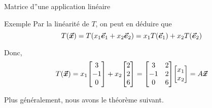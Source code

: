 \documentclass{article}
\begin{document}
\begin{parag}{Matrice d''une application linéaire}
\begin{subparag}{Exemple}
        Par la linéarité de $T$, on peut en déduire que
        \[T\left(\bvec{x}\right) = T\left(x_1 \bvec{e}_1 + x_2 \bvec{e}_2\right)= x_1 T\left(\bvec{e}_1\right) + x_2 T\left(\bvec{e}_2\right)\]

        Donc,
        \[T\left(\bvec{x}\right) = x_1 \begin{bmatrix} 3 \\ -1 \\ 0 \end{bmatrix} + x_2 \begin{bmatrix} 2 \\ 2 \\ 6 \end{bmatrix} = \begin{bmatrix} 3 & 2 \\ -1 & 2 \\ 0 & 6 \end{bmatrix} \begin{bmatrix} x_1 \\ x_2 \end{bmatrix} = A \bvec{x}\]
    \end{subparag}

    Plus généralement, nous avons le théorème suivant.
\end{parag}
\end{document}
